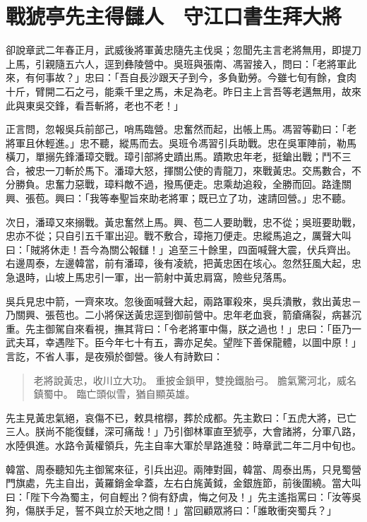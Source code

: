 
\chapter{戰猇亭先主得讎人　守江口書生拜大將}

卻說章武二年春正月，武威後將軍黃忠隨先主伐吳；忽聞先主言老將無用，即提刀上馬，引親隨五六人，逕到彝陵營中。吳班與張南、馮習接入，問曰：「老將軍此來，有何事故？」忠曰：「吾自長沙跟天子到今，多負勤勞。今雖七旬有餘，食肉十斤，臂開二石之弓，能乘千里之馬，未足為老。昨日主上言吾等老邁無用，故來此與東吳交鋒，看吾斬將，老也不老！」

正言問，忽報吳兵前部己，哨馬臨營。忠奮然而起，出帳上馬。馮習等勸曰：「老將軍且休輕進。」忠不聽，縱馬而去。吳班令馮習引兵助戰。忠在吳軍陣前，勒馬橫刀，單搦先鋒潘璋交戰。璋引部將史蹟出馬。蹟欺忠年老，挺鎗出戰；鬥不三合，被忠一刀斬於馬下。潘璋大怒，揮關公使的青龍刀，來戰黃忠。交馬數合，不分勝負。忠奮力惡戰，璋料敵不過，撥馬便走。忠乘劫追殺，全勝而回。路逢關興、張苞。興曰：「我等奉聖旨來助老將軍；既已立了功，速請回營。」忠不聽。

次日，潘璋又來搦戰。黃忠奮然上馬。興、苞二人要助戰，忠不從；吳班要助戰，忠亦不從；只自引五千軍出迎。戰不敷合，璋拖刀便走。忠縱馬追之，厲聲大叫曰：「賊將休走！吾今為關公報讎！」追至三十餘里，四面喊聲大震，伏兵齊出。右邊周泰，左邊韓當，前有潘璋，後有凌統，把黃忠困在垓心。忽然狂風大起，忠急退時，山坡上馬忠引一軍，出一箭射中黃忠肩窩，險些兒落馬。

吳兵見忠中箭，一齊來攻。忽後面喊聲大起，兩路軍殺來，吳兵潰散，救出黃忠－乃關興、張苞也。二小將保送黃忠逕到御前營中。忠年老血衰，箭瘡痛裂，病甚沉重。先主御駕自來看視，撫其背曰：「令老將軍中傷，朕之過也！」忠曰：「臣乃一武夫耳，幸遇陛下。臣今年七十有五，壽亦足矣。望陛下善保龍體，以圖中原！」言訖，不省人事，是夜殞於御營。後人有詩歎曰：

\begin{quote}
老將說黃忠，收川立大功。
重披金鎖甲，雙挽鐵胎弓。
膽氣驚河北，威名鎮蜀中。
臨亡頭似雪，猶自顯英雄。
\end{quote}

先主見黃忠氣絕，哀傷不已，敕具棺槨，葬於成都。先主歎曰：「五虎大將，已亡三人。朕尚不能復讎，深可痛哉！」乃引御林軍直至猇亭，大會諸將，分軍八路，水陸俱進。水路令黃權領兵，先主自率大軍於旱路進發：時章武二年二月中旬也。

韓當、周泰聽知先主御駕來征，引兵出迎。兩陣對圓，韓當、周泰出馬，只見蜀營門旗處，先主自出，黃羅銷金傘蓋，左右白旄黃鉞，金銀旌節，前後圍繞。當大叫曰：「陛下今為蜀主，何自輕出？倘有舒虞，悔之何及！」先主遙指罵曰：「汝等吳狗，傷朕手足，誓不與立於天地之間！」當回顧眾將曰：「誰敢衝突蜀兵？」

